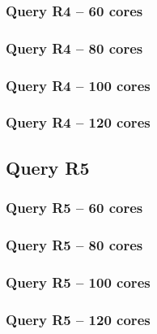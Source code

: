 \documentclass[a4paper,11pt]{article}
\begin{document}
\subsubsection{Query R4 -- 60 cores}
\newpage
\subsubsection{Query R4 -- 80 cores}
\newpage
\subsubsection{Query R4 -- 100 cores}
\newpage
\subsubsection{Query R4 -- 120 cores}
\newpage
\subsection{Query R5}
\subsubsection{Query R5 -- 60 cores}
\newpage
\subsubsection{Query R5 -- 80 cores}
\newpage
\subsubsection{Query R5 -- 100 cores}
\newpage
\subsubsection{Query R5 -- 120 cores}
\end{document}
